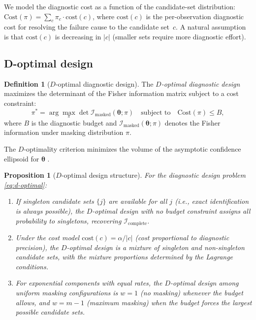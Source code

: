\documentclass[11pt]{article}
\theoremstyle{definition}
\newtheorem{definition}{Definition}
\theoremstyle{plain}
\newtheorem{proposition}{Proposition}
\renewcommand{\v}[1]{\boldsymbol{#1}}
\newcommand{\btheta}{\v{\theta}}
\newcommand{\FI}{\mathcal{I}}       %
\begin{document}
We model the diagnostic cost as a function of the candidate-set
distribution: $\text{Cost}(\pi) = \sum_c \pi_c \cdot \text{cost}(c)$,
where $\text{cost}(c)$ is the per-observation diagnostic cost for
resolving the failure cause to the candidate set~$c$.
A natural assumption is that $\text{cost}(c)$ is decreasing in $|c|$
(smaller sets require more diagnostic effort).

\subsection{D-optimal design}

\begin{definition}[$D$-optimal diagnostic design]
\label{def:d-optimal}
The \emph{$D$-optimal diagnostic design} maximizes the determinant
of the Fisher information matrix subject to a cost constraint:
\begin{equation}
\label{eq:d-optimal}
    \pi^* = \arg\max_\pi \det \FI_{\mathrm{masked}}(\btheta; \pi)
    \quad \text{subject to} \quad
    \text{Cost}(\pi) \leq B,
\end{equation}
where $B$ is the diagnostic budget and
$\FI_{\mathrm{masked}}(\btheta; \pi)$ denotes the Fisher information
under masking distribution $\pi$.
\end{definition}

The $D$-optimality criterion minimizes the volume of the asymptotic
confidence ellipsoid for $\btheta$
\citep{atkinson2007,pukelsheim2006}.

\begin{proposition}[$D$-optimal design structure]
\label{prop:d-optimal-structure}
For the diagnostic design problem \eqref{eq:d-optimal}:
\begin{enumerate}[label=(\alph*)]
    \item If singleton candidate sets $\{j\}$ are available for all
    $j$ (i.e., exact identification is always possible), the
    $D$-optimal design with no budget constraint assigns all
    probability to singletons, recovering $\FI_{\mathrm{complete}}$.
    \item Under the cost model
    $\text{cost}(c) = \alpha / |c|$ (cost proportional to diagnostic
    precision), the $D$-optimal design is a mixture of singleton and
    non-singleton candidate sets, with the mixture proportions
    determined by the Lagrange conditions.
    \item For exponential components with equal rates, the $D$-optimal
    design among uniform masking configurations is $w = 1$ (no masking)
    whenever the budget allows, and $w = m - 1$ (maximum masking)
    when the budget forces the largest possible candidate sets.
\end{enumerate}
\end{proposition}
\end{document}
